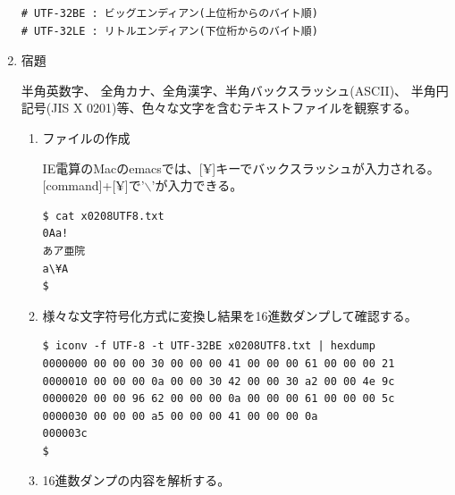 \documentclass[a4j,dvipdfmx]{jarticle}
\begin{document}
\begin{enumerate}
\begin{lstlisting}[numbers=none]
# UTF-32BE : ビッグエンディアン(上位桁からのバイト順)
# UTF-32LE : リトルエンディアン(下位桁からのバイト順)
\end{lstlisting}

\newpage

\item 宿題

半角英数字、
全角カナ、全角漢字、半角バックスラッシュ(ASCII)、
半角円記号(JIS X 0201)等、色々な文字を含むテキストファイルを観察する。

\begin{enumerate}
\item ファイルの作成


IE電算のMacのemacsでは、[¥]キーでバックスラッシュが入力される。
[command]+[¥]で'$\backslash$'が入力できる。

\begin{lstlisting}[numbers=none]
$ cat x0208UTF8.txt
0Aa!
あア亜院
a\¥A
$
\end{lstlisting}

\item 様々な文字符号化方式に変換し結果を16進数ダンプして確認する。

\begin{lstlisting}[numbers=none]
$ iconv -f UTF-8 -t UTF-32BE x0208UTF8.txt | hexdump
0000000 00 00 00 30 00 00 00 41 00 00 00 61 00 00 00 21
0000010 00 00 00 0a 00 00 30 42 00 00 30 a2 00 00 4e 9c
0000020 00 00 96 62 00 00 00 0a 00 00 00 61 00 00 00 5c
0000030 00 00 00 a5 00 00 00 41 00 00 00 0a            
000003c
$
\end{lstlisting}

\item 16進数ダンプの内容を解析する。


\end{enumerate}
\end{enumerate}
\end{document}

